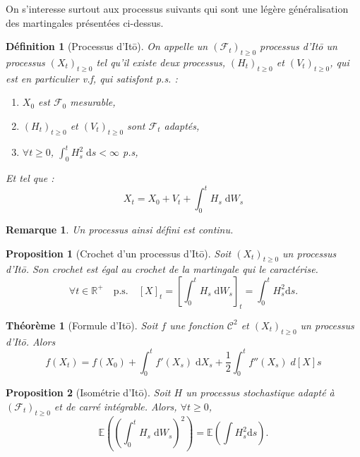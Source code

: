\documentclass[openany]{book}
\newcommand{\F}{\mathscr{F}}
\newcommand{\R}{\mathbb{R}}
\newcommand{\E}{\mathbb{E}}
\newcommand{\1}{\mathbbm{1}}
\renewcommand{\d}{\mathrm{d}}
\theoremstyle{thmfont}
\newtheorem{theorem}{Théorème}[chapter]
\theoremstyle{deffont}
\newtheorem{definition}[definition]{Définition}
\theoremstyle{thmfont}
\newtheorem{prop}[prop]{Proposition}
\theoremstyle{deffont}
\newtheorem{remark}[remark]{Remarque}
\begin{document}
On s'interesse surtout aux processus suivants qui sont une légère généralisation des martingales présentées ci-dessus.
\begin{definition}[Processus d'Itō] On appelle un $(\F_t)_{t\geq0}$ \textit{processus d'Itō} un processus $(X_t)_{t\geq0}$ tel qu'il existe deux processus, $(H_t)_{t\geq0}$ et $(V_t)_{t\geq 0}$, qui est en particulier v.f, qui satisfont p.s. :
  \begin{enumerate}
  \item $X_0$ est $\F_0$ mesurable,
  \item $(H_t)_{t\geq0}$ et $(V_t)_{t\geq0}$ sont $\F_t$ adaptés,
  \item $\forall t \geq 0$, $\int_0^t H_s^2\;\d s < \infty$ p.s,
    \end{enumerate}

    Et tel que :
   $$X_t = X_0 + V_t + \int_0^t H_s \;\d W_s$$
 \end{definition}
 \begin{remark}
   \label{rmk:ContinuitePrIto}
   Un processus ainsi défini est continu.
 \end{remark}
 
 \begin{prop}[Crochet d'un processus d'Itō] Soit $(X_t)_{t\geq0}$ un processus d'Itō. Son crochet est égal au crochet de la martingale qui le caractérise.
   $$\forall t \in  \R^+ \quad\text{p.s.}\quad [X]_t = \left[\int_0^tH_s \;\d W_s\right]_t = \int_0^t H_s^2 \d s.$$
  \end{prop}

  \begin{theorem}[Formule d'Itō]
  Soit $f$ une fonction $\mathcal C^2$ et $(X_t)_{t\geq0}$ un processus d'Itō. Alors
  \begin{equation}
    f(X_t) = f(X_0) + \int_0^t f'(X_s) \;\d X_s + \dfrac{1}{2} \int_0^t f''(X_s) \;d[X]s
  \end{equation}
  \end{theorem}

\begin{prop}[Isométrie d'Itō] Soit $H$ un processus stochastique adapté à $(\F_t)_{t\geq0}$ et de carré intégrable. Alors, $\forall t \geq 0$,
  \begin{equation}
    \E\left( \left(\int_0^t H_s \;\d W_s\right)^2\right) = \E\left( \int H_s^2 \d s\right).
  \end{equation}
  

  \end{prop}
\end{document}
